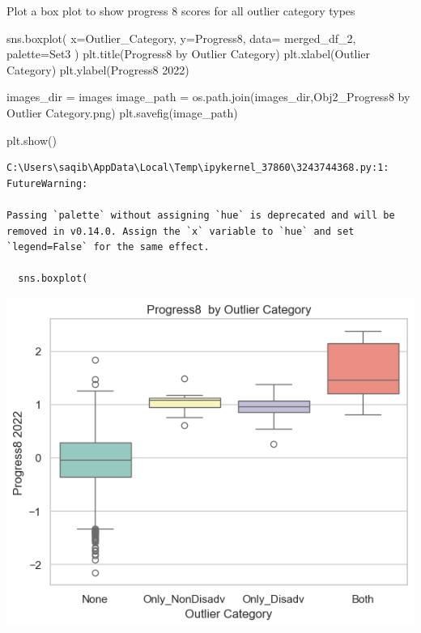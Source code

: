 \documentclass[
  letterpaper,
  DIV=11,
  numbers=noendperiod]{scrartcl}
\newenvironment{Shaded}{\begin{snugshade}}{\end{snugshade}}
\newcommand{\NormalTok}[1]{\textcolor[rgb]{0.00,0.23,0.31}{#1}}
\newcommand{\OperatorTok}[1]{\textcolor[rgb]{0.37,0.37,0.37}{#1}}
\newcommand{\StringTok}[1]{\textcolor[rgb]{0.13,0.47,0.30}{#1}}
\begin{document}
Plot a box plot to show progress 8 scores for all outlier category types

\begin{Shaded}
\begin{Highlighting}[]
\NormalTok{sns.boxplot(}
\NormalTok{    x}\OperatorTok{=}\StringTok{\textquotesingle{}Outlier\_Category\textquotesingle{}}\NormalTok{, }
\NormalTok{    y}\OperatorTok{=}\StringTok{\textquotesingle{}Progress8\textquotesingle{}}\NormalTok{, }
\NormalTok{    data}\OperatorTok{=}\NormalTok{ merged\_df\_2,  }
\NormalTok{    palette}\OperatorTok{=}\StringTok{\textquotesingle{}Set3\textquotesingle{}}
\NormalTok{)}
\NormalTok{plt.title(}\StringTok{\textquotesingle{}Progress8  by Outlier Category\textquotesingle{}}\NormalTok{)}
\NormalTok{plt.xlabel(}\StringTok{\textquotesingle{}Outlier Category\textquotesingle{}}\NormalTok{)}
\NormalTok{plt.ylabel(}\StringTok{\textquotesingle{}Progress8 2022\textquotesingle{}}\NormalTok{)}


\NormalTok{images\_dir }\OperatorTok{=} \StringTok{\textquotesingle{}images\textquotesingle{}}
\NormalTok{image\_path }\OperatorTok{=}\NormalTok{ os.path.join(images\_dir,}\StringTok{\textquotesingle{}Obj2\_Progress8 by Outlier Category.png\textquotesingle{}}\NormalTok{)}
\NormalTok{plt.savefig(image\_path)}

\NormalTok{plt.show()}
\end{Highlighting}
\end{Shaded}

\begin{verbatim}
C:\Users\saqib\AppData\Local\Temp\ipykernel_37860\3243744368.py:1: FutureWarning: 

Passing `palette` without assigning `hue` is deprecated and will be removed in v0.14.0. Assign the `x` variable to `hue` and set `legend=False` for the same effect.

  sns.boxplot(
\end{verbatim}

\includegraphics{P4DS_A2_Data_Analysis_Project_files/figure-pdf/cell-83-output-2.png}
\end{document}
